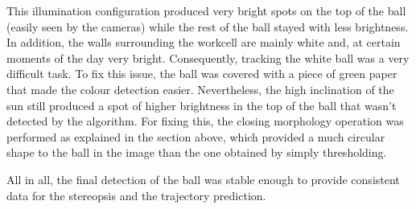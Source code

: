 This illumination configuration produced very bright spots on the top of the ball (easily seen by the cameras) while the rest of the ball stayed with less brightness. In addition, the walls surrounding the workcell are mainly white and, at certain moments of the day very bright. Consequently, tracking the white ball was a very difficult task. To fix this issue, the ball was covered with a piece of green paper that made the colour detection easier. Nevertheless, the high inclination of the sun still produced a spot of higher brightness in the top of the ball that wasn't detected by the algorithm. For fixing this, the closing morphology operation was performed as explained in the section above, which provided a much circular shape to the ball in the image than the one obtained by simply thresholding.

All in all, the final detection of the ball was stable enough to provide consistent data for the stereopsis and the trajectory prediction.


